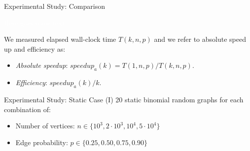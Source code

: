 \begin{frame}{Experimental Study: Comparison}
    \centering
    
    \textcolor{white}{Here goes some text}
    
    \justifying
    We measured elapsed wall-clock time $T(k,n,p)$ and we refer to  absolute speed up and efficiency as: 
    \begin{itemize}
        \item \textit{Absolute speedup}: $speedup_a(k) = T(1, n, p)/T(k, n, p)$.
        \item \textit{Efficiency}: $speedup_a(k)/k$.
    \end{itemize} 

\end{frame}

\begin{frame}{Experimental Study: Static Case (I)}
    20 static binomial random graphs for each combination of:
    \begin{itemize}
        \item Number of vertices: $n \in \{ 10^3, 2\cdot10^3, 10^4, 5\cdot10^4 \}$
        \item Edge probability: $p \in \{ 0.25, 0.50, 0.75, 0.90\}$
    \end{itemize}

\end{frame}

